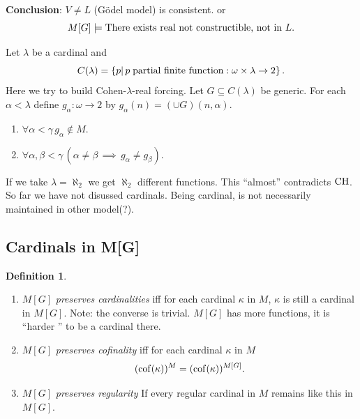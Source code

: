 \documentclass[11pt,pdftex,twoside,a4paper]{article}
\newcommand{\B}[1]{\textbf{#1}}
\newcommand{\CH}{\ensuremath{\mathop{\rm CH}\nolimits}}
\newcommand{\cof}{\ensuremath{\mathop{\rm cof}\nolimits}}
\theoremstyle{definition}
\newtheorem{ldef}[thm]{Definition}
\begin{document}
\B{Conclusion}: \(V \neq L\) (G\"odel model) is consistent.
or
\begin{equation*}
M[G] \models \textnormal{There exists real not constructible, not in }L.
\end{equation*}

Let \(\lambda\) be a cardinal and
\begin{equation*}
C(\lambda) =
  \left\{p|\, p\;\textnormal{partial finite function}:
    \omega\times\lambda\to 2\right\}.
\end{equation*}
Here we try to build Cohen-\(\lambda\)-real forcing.
Let \(G\subseteq C(\lambda)\) be generic. For each \(\alpha<\lambda\)
define \(g_\alpha:\omega\to 2\) by
\(g_\alpha(n) = (\cup G)(n,\alpha)\).
\begin{enumerate}[label={(\alph*)}]
\item \(\forall \alpha<\gamma\, g_\alpha\notin M\).
\item \(\forall \alpha,\beta<\gamma\,
  (\alpha\neq\beta\,\implies\,g_\alpha\neq g_\beta)\).
\end{enumerate}

If we take \(\lambda=\aleph_2\) we get \(\aleph_2\) different functions.
This ``almost'' contradicts \CH.
So far we have not disussed cardinals. Being cardinal,
is not necessarily maintained in other model(?).

\subsection{Cardinals in M[G]}

\begin{ldef}
\begin{enumerate}[label={(\alph*)}]
\item \(M[G]\) \emph{preserves cardinalities} iff for each cardinal
  \(\kappa\) in $M$, \(\kappa\) is still a cardinal in \(M[G]\).
  Note: the converse is trivial. \(M[G]\) has more functions,
  it is ``harder '' to be a cardinal there.
\item \(M[G]\) \emph{preserves cofinality} iff for each cardinal
  \(\kappa\) in $M$
  \begin{equation*}
    (\cof(\kappa))^M = (\cof(\kappa))^{M[G]}.
  \end{equation*}
\item \(M[G]\) \emph{preserves regularity}
  If every regular cardinal in $M$ remains like this in \(M[G]\).
\end{enumerate}
\end{ldef}
\end{document}
